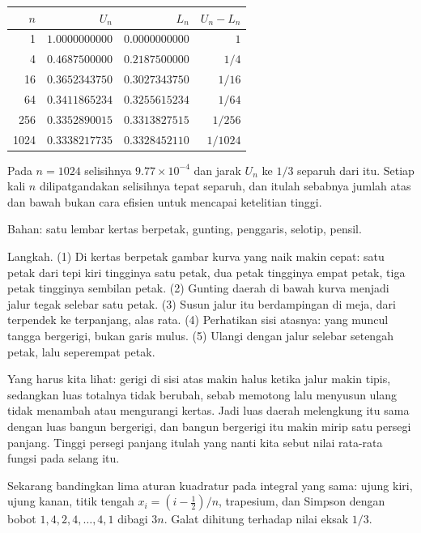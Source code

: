 \begin{center}\small
\begin{tabular}{rrrr}
\hline
$n$ & $U_n$ & $L_n$ & $U_n-L_n$ \\
\hline
1 & $1.0000000000$ & $0.0000000000$ & $1$ \\
4 & $0.4687500000$ & $0.2187500000$ & $1/4$ \\
16 & $0.3652343750$ & $0.3027343750$ & $1/16$ \\
64 & $0.3411865234$ & $0.3255615234$ & $1/64$ \\
256 & $0.3352890015$ & $0.3313827515$ & $1/256$ \\
1024 & $0.3338217735$ & $0.3328452110$ & $1/1024$ \\
\hline
\end{tabular}
\end{center}

Pada $n=1024$ selisihnya $9.77\times10^{-4}$ dan jarak $U_n$ ke $1/3$ separuh dari itu.
Setiap kali $n$ dilipatgandakan selisihnya tepat separuh, dan itulah sebabnya jumlah
atas dan bawah bukan cara efisien untuk mencapai ketelitian tinggi.

\begin{tangan}
Bahan: satu lembar kertas berpetak, gunting, penggaris, selotip, pensil.

Langkah. (1) Di kertas berpetak gambar kurva yang naik makin cepat: satu petak dari
tepi kiri tingginya satu petak, dua petak tingginya empat petak, tiga petak tingginya
sembilan petak. (2) Gunting daerah di bawah kurva menjadi jalur tegak selebar satu
petak. (3) Susun jalur itu berdampingan di meja, dari terpendek ke terpanjang, alas
rata. (4) Perhatikan sisi atasnya: yang muncul tangga bergerigi, bukan garis mulus.
(5) Ulangi dengan jalur selebar setengah petak, lalu seperempat petak.

Yang harus kita lihat: gerigi di sisi atas makin halus ketika jalur makin tipis,
sedangkan luas totalnya tidak berubah, sebab memotong lalu menyusun ulang tidak
menambah atau mengurangi kertas. Jadi luas daerah melengkung itu sama dengan luas
bangun bergerigi, dan bangun bergerigi itu makin mirip satu persegi panjang. Tinggi
persegi panjang itulah yang nanti kita sebut nilai rata-rata fungsi pada selang itu.
\end{tangan}

Sekarang bandingkan lima aturan kuadratur pada integral yang sama: ujung kiri, ujung
kanan, titik tengah $x_i=(i-\frac12)/n$, trapesium, dan Simpson dengan bobot
$1,4,2,4,\dots,4,1$ dibagi $3n$. Galat dihitung terhadap nilai eksak $1/3$.

